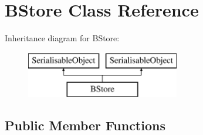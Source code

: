 \hypertarget{classBStore}{\section{B\-Store Class Reference}
\label{classBStore}
}
Inheritance diagram for B\-Store\-:\begin{figure}[H]
\begin{center}
\leavevmode
\includegraphics[height=2.000000cm]{classBStore}
\end{center}
\end{figure}
\subsection*{Public Member Functions}
